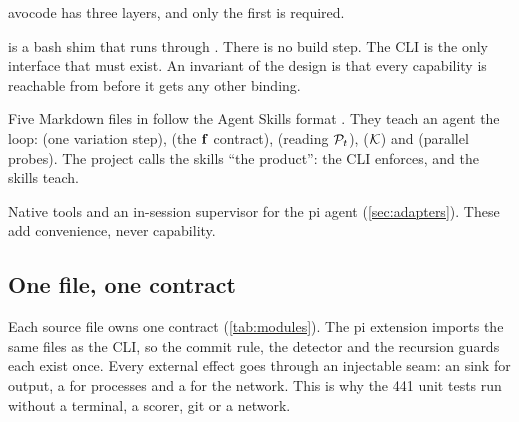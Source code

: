 avocode has three layers, and only the first is required.
\begin{description}[leftmargin=*,itemsep=2pt,font=\normalfont\bfseries]
  \item[CLI.]  is a bash shim that runs  through . There is
    no build step. The CLI is the only interface that must exist. An invariant of the design is
    that every capability is reachable from  before it gets any other binding.
  \item[Skills.] Five Markdown files in  follow the Agent Skills format
    \citep{agentskills2025spec}. They teach an agent the loop:  (one variation step),
     (the $\mathbf{f}$ contract),  (reading $\mathcal{P}_t$), 
    ($\mathcal{K}$) and  (parallel probes). The project calls the skills ``the product'':
    the CLI enforces, and the skills teach.
  \item[Bindings.] Native tools and an in-session supervisor for the pi agent
    (\cref{sec:adapters}). These add convenience, never capability.
\end{description}

\subsection{One file, one contract}

Each source file owns one contract (\cref{tab:modules}). The pi extension imports the same files
as the CLI, so the commit rule, the detector and the recursion guards each exist once. Every
external effect goes through an injectable seam: an  sink for output, a  for
processes and a  for the network. This is why the 441 unit tests run without a
terminal, a scorer, git or a network.


